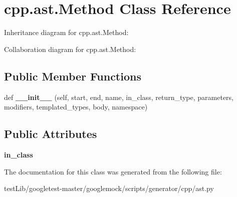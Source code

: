 \hypertarget{classcpp_1_1ast_1_1Method}{}\section{cpp.\+ast.\+Method Class Reference}
\label{classcpp_1_1ast_1_1Method}


Inheritance diagram for cpp.\+ast.\+Method\+:


Collaboration diagram for cpp.\+ast.\+Method\+:
\subsection*{Public Member Functions}
\begin{DoxyCompactItemize}
\item 
\mbox{\label{classcpp_1_1ast_1_1Method_aa3cbdc9c4b7e92b15fa6acea0dbf2322}} 
def {\bfseries \+\_\+\+\_\+init\+\_\+\+\_\+} (self, start, end, name, in\+\_\+class, return\+\_\+type, parameters, modifiers, templated\+\_\+types, body, namespace)
\end{DoxyCompactItemize}
\subsection*{Public Attributes}
\begin{DoxyCompactItemize}
\item 
\mbox{\label{classcpp_1_1ast_1_1Method_aa67244c3673afed43398b5d3e3fa6c1c}} 
{\bfseries in\+\_\+class}
\end{DoxyCompactItemize}


The documentation for this class was generated from the following file\+:\begin{DoxyCompactItemize}
\item 
test\+Lib/googletest-\/master/googlemock/scripts/generator/cpp/ast.\+py\end{DoxyCompactItemize}

